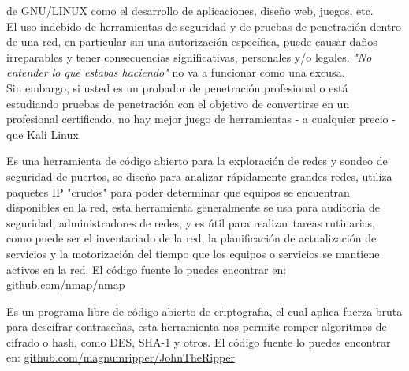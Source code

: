 \begin{multicols}{2}

de GNU/LINUX como el desarrollo de aplicaciones, diseño web, juegos, etc.\\

El uso indebido de herramientas de seguridad y de pruebas de penetración dentro de una red, en particular sin una autorización específica, puede causar daños irreparables y tener consecuencias significativas, personales y/o legales. \textit{"No entender lo que estabas haciendo"} no va a funcionar como una excusa.\\

Sin embargo, si usted es un probador de penetración profesional o está estudiando pruebas de penetración con el objetivo de convertirse en un profesional certificado, no hay mejor juego de herramientas - a cualquier precio - que Kali Linux.\\



Es una herramienta de código abierto para la exploración de redes y sondeo de seguridad de puertos, se diseño para analizar rápidamente grandes redes, utiliza paquetes IP "crudos" para poder determinar que equipos se encuentran disponibles en la red, esta herramienta generalmente se usa para auditoria de seguridad, administradores de redes, y es útil para realizar tareas rutinarias, como puede ser el inventariado de la red, la planificación de actualización de servicios y la motorización del tiempo que los equipos o servicios se mantiene activos en la red. El código fuente lo puedes encontrar en: \href{https://github.com/nmap/nmap}{github.com/nmap/nmap}\\


Es un programa libre de código abierto de criptografia, el cual aplica fuerza bruta para descifrar contraseñas, esta herramienta nos permite romper algoritmos de cifrado o hash, como DES, SHA-1 y otros. El código fuente lo puedes encontrar en: \href{https://github.com/magnumripper/JohnTheRipper}{github.com/magnumripper/JohnTheRipper}



\end{multicols}
